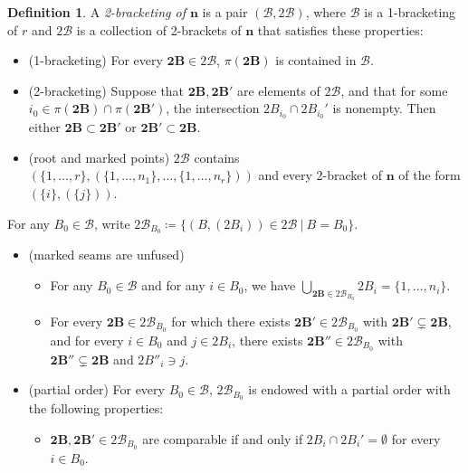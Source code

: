 \documentclass[11pt]{amsart}
\theoremstyle{definition}
\newtheorem{definition}[theorem]{Definition}
\theoremstyle{remark}
\theoremstyle{plain}
\newcommand\bn{\mathbf{n}}
\newcommand{\btB}{{\mathbf{2B}}}
\newcommand{\sB}{\mathscr{B}}
\newcommand{\stB}{2\mathscr{B}}
\begin{document}
\begin{definition}
\label{def:Wn_br}
A \emph{2-bracketing of $\bn$} is a pair $(\sB, \stB)$,\label{p:sBstB} where $\sB$ is a 1-bracketing of $r$ and $\stB$ is a collection of 2-brackets of $\bn$ that satisfies these properties:
\begin{itemize}
\item[] {\sc (1-bracketing)} For every $\btB \in \stB$, $\pi(\btB)$ is contained in $\sB$.

\medskip

\item[] {\sc (2-bracketing)}
Suppose that $\btB, \btB'$ are elements of $\stB$, and that for some $i_0 \in \pi(\btB) \cap \pi(\btB')$, the intersection $2B_{i_0} \cap 2B_{i_0}'$ is nonempty.
Then either $\btB \subset \btB'$ or $\btB' \subset \btB$.

\medskip

\item[] {\sc (root and marked points)} $\stB$ contains $(\{1,\ldots,r\},(\{1,\ldots,n_1\},\ldots,\{1,\ldots,n_r\}))$ and every 2-bracket of $\bn$ of the form $(\{i\},(\{j\}))$.
\end{itemize}

\noindent For any $B_0 \in \sB$, write $\stB_{B_0} \coloneqq \{(B,(2B_i)) \in \stB \:|\: B = B_0\}$.

\begin{itemize}
\item[] {\sc (marked seams are unfused)}
\begin{itemize}
\item For any $B_0 \in \sB$ and for any $i \in B_0$, we have $\bigcup_{\btB \in \stB_{B_0}} 2B_i = \{1,\ldots,n_i\}$.

\item For every $\btB \in \stB_{B_0}$ for which there exists $\btB' \in \stB_{B_0}$ with $\btB' \subsetneq \btB$, and for every $i \in B_0$ and $j \in 2B_i$, there exists $\btB'' \in \stB_{B_0}$ with $\btB'' \subsetneq \btB$ and $2B''_i \ni j$.
\end{itemize}

\medskip

\item[] {\sc (partial order)} For every $B_0 \in \sB$, $\stB_{B_0}$ is endowed with a partial order with the following properties:
\begin{itemize}
\item $\btB, \btB' \in \stB_{B_0}$ are comparable if and only if $2B_i \cap 2B_i' = \emptyset$ for every $i \in B_0$.


\end{itemize}
\end{itemize}
\end{definition}
\end{document}
